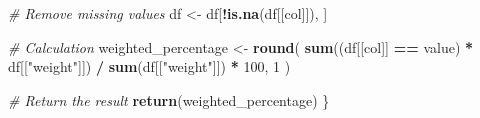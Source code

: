 \documentclass[
]{article}
\newenvironment{Shaded}{\begin{snugshade}}{\end{snugshade}}
\newcommand{\CommentTok}[1]{\textcolor[rgb]{0.56,0.35,0.01}{\textit{#1}}}
\newcommand{\DecValTok}[1]{\textcolor[rgb]{0.00,0.00,0.81}{#1}}
\newcommand{\FunctionTok}[1]{\textcolor[rgb]{0.13,0.29,0.53}{\textbf{#1}}}
\newcommand{\NormalTok}[1]{#1}
\newcommand{\OtherTok}[1]{\textcolor[rgb]{0.56,0.35,0.01}{#1}}
\newcommand{\SpecialCharTok}[1]{\textcolor[rgb]{0.81,0.36,0.00}{\textbf{#1}}}
\newcommand{\StringTok}[1]{\textcolor[rgb]{0.31,0.60,0.02}{#1}}
\begin{document}
\begin{Shaded}
\begin{Highlighting}[]
  \CommentTok{\# Remove missing values}
\NormalTok{  df }\OtherTok{\textless{}{-}}\NormalTok{ df[}\SpecialCharTok{!}\FunctionTok{is.na}\NormalTok{(df[[col]]), ]}
  
  \CommentTok{\# Calculation}
\NormalTok{  weighted\_percentage }\OtherTok{\textless{}{-}} \FunctionTok{round}\NormalTok{(}
    \FunctionTok{sum}\NormalTok{((df[[col]] }\SpecialCharTok{==}\NormalTok{ value) }\SpecialCharTok{*}\NormalTok{ df[[}\StringTok{"weight"}\NormalTok{]]) }\SpecialCharTok{/} \FunctionTok{sum}\NormalTok{(df[[}\StringTok{"weight"}\NormalTok{]]) }\SpecialCharTok{*} \DecValTok{100}\NormalTok{,}
    \DecValTok{1}
\NormalTok{  )}
  
  \CommentTok{\# Return the result}
  \FunctionTok{return}\NormalTok{(weighted\_percentage)}
\NormalTok{\}}
\end{Highlighting}
\end{Shaded}
\end{document}
